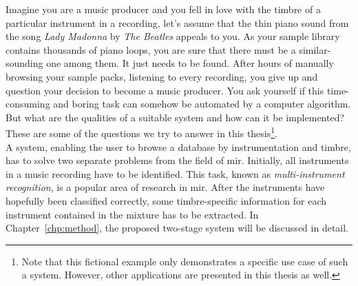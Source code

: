 Imagine you are a music producer and you fell in love with the timbre of a particular instrument in a recording, let's assume that the thin piano sound from the song \textit{Lady Madonna} by \textit{The Beatles} appeals to you. As your sample library contains thousands of piano loops, you are sure that there must be a similar-sounding one among them. It just needs to be found. After hours of manually browsing your sample packs, listening to every recording, you give up and question your decision to become a music producer. You ask yourself if this time-consuming and boring task can somehow be automated by a computer algorithm. But what are the qualities of a suitable system and how can it be implemented? These are some of the questions we try to answer in this thesis\footnote{Note that this fictional example only demonstrates a specific use case of such a system. However, other applications are presented in this thesis as well.}.\\

A system, enabling the user to browse a database by instrumentation and timbre, has to solve two separate problems from the field of \gls{mir}. Initially, all instruments in a music recording have to be identified. This task, known as \textit{multi-instrument recognition}, is a popular area of research in \gls{mir}. After the instruments have hopefully been classified correctly, some timbre-specific information for each instrument contained in the mixture has to be extracted. In Chapter~\ref{chp:method}, the proposed two-stage system will be discussed in detail.\\

